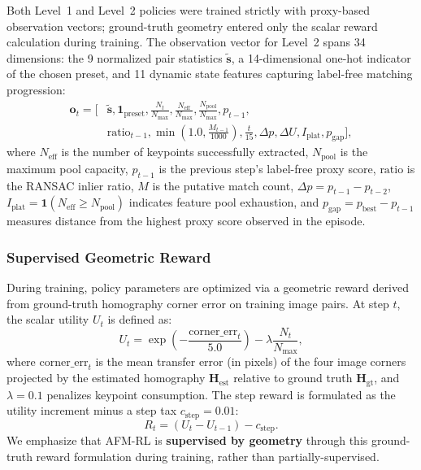 \documentclass[conference]{IEEEtran}
\begin{document}
Both Level~1 and Level~2 policies were trained strictly with proxy-based observation vectors; ground-truth geometry entered only the scalar reward calculation during training. The observation vector for Level~2 spans 34 dimensions: the 9 normalized pair statistics $\mathbf{\tilde{s}}$, a 14-dimensional one-hot indicator of the chosen preset, and 11 dynamic state features capturing label-free matching progression:
\begin{align}
\mathbf{o}_t = [&\mathbf{\tilde{s}}, \mathbf{1}_{\text{preset}}, \frac{N_t}{N_{\max}}, \frac{N_{\text{eff}}}{N_{\max}}, \frac{N_{\text{pool}}}{N_{\max}}, p_{t-1}, \nonumber \\
&\text{ratio}_{t-1}, \min\left(1.0, \frac{M_{t-1}}{1000}\right), \frac{t}{15}, \Delta p, \Delta U, I_{\text{plat}}, p_{\text{gap}}],
\end{align}
where $N_{\text{eff}}$ is the number of keypoints successfully extracted, $N_{\text{pool}}$ is the maximum pool capacity, $p_{t-1}$ is the previous step's label-free proxy score, $\text{ratio}$ is the RANSAC inlier ratio, $M$ is the putative match count, $\Delta p = p_{t-1} - p_{t-2}$, $I_{\text{plat}} = \mathbf{1}(N_{\text{eff}} \ge N_{\text{pool}})$ indicates feature pool exhaustion, and $p_{\text{gap}} = p_{\text{best}} - p_{t-1}$ measures distance from the highest proxy score observed in the episode.

\subsubsection{Supervised Geometric Reward}
During training, policy parameters are optimized via a geometric reward derived from ground-truth homography corner error on training image pairs. At step $t$, the scalar utility $U_t$ is defined as:
\begin{equation}
U_t = \exp\left(-\frac{\text{corner\_err}_t}{5.0}\right) - \lambda \frac{N_t}{N_{\max}},
\end{equation}
where $\text{corner\_err}_t$ is the mean transfer error (in pixels) of the four image corners projected by the estimated homography $\mathbf{H}_{\text{est}}$ relative to ground truth $\mathbf{H}_{\text{gt}}$, and $\lambda = 0.1$ penalizes keypoint consumption. The step reward is formulated as the utility increment minus a step tax $c_{\text{step}} = 0.01$:
\begin{equation}
R_t = (U_t - U_{t-1}) - c_{\text{step}}.
\end{equation}
We emphasize that AFM-RL is \textbf{supervised by geometry} through this ground-truth reward formulation during training, rather than partially-supervised.
\end{document}
